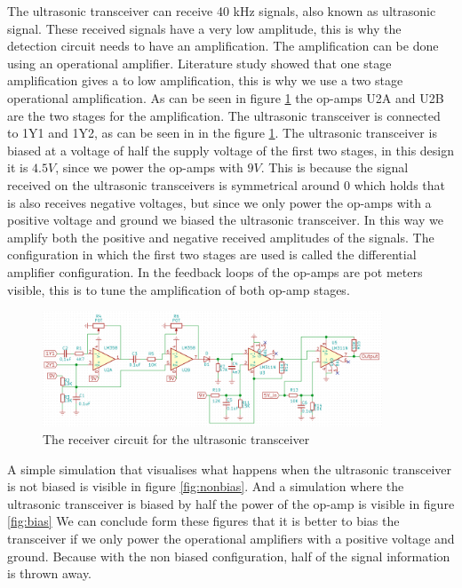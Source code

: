 The ultrasonic transceiver can receive 40 kHz signals, also known as ultrasonic signal. These received signals have a very low amplitude, this is why the detection circuit needs to have an amplification. The amplification can be done using an operational amplifier. Literature study showed that one stage amplification gives a to low amplification, this is why we use a two stage operational amplification. As can be seen in figure \ref{fig:receivecircuit} the op-amps U2A and U2B are the two stages for the amplification.
The ultrasonic transceiver is connected to 1Y1 and 1Y2, as can be seen in in the figure \ref{fig:receivecircuit}. The ultrasonic transceiver is biased at a voltage of half the supply voltage of the first two stages, in this design it is $4.5V$, since we power the op-amps with $9V$. This is because the signal received on the ultrasonic transceivers is symmetrical around 0 which holds that is also receives negative voltages, but since we only power the op-amps with a positive voltage and ground we biased the ultrasonic transceiver. In this way we amplify both the positive and negative received amplitudes of the signals. The configuration in which the first two stages are used is called the differential amplifier configuration. In the feedback loops of the op-amps are pot meters visible, this is to tune the amplification of both op-amp stages.

\begin{figure}[H]
\centering
\includegraphics[width=0.9\textwidth]{Figures/receivercircuit.PNG}
\caption{The receiver circuit for the ultrasonic transceiver}
\label{fig:receivecircuit}
\end{figure}

A simple simulation that visualises what happens when the ultrasonic transceiver is not biased is visible in figure \ref{fig:nonbias}.
And a simulation where the ultrasonic transceiver is biased by half the power of the op-amp is visible in figure \ref{fig:bias}
We can conclude form these figures that it is better to bias the transceiver if we only power the operational amplifiers with a positive voltage and ground. Because with the non biased configuration, half of the signal information is thrown away.

